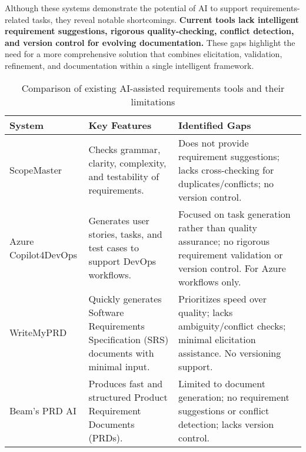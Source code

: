 Although these systems demonstrate the potential of AI to support requirements-related tasks, they reveal notable shortcomings. \textbf{Current tools lack intelligent requirement suggestions, rigorous quality-checking, conflict detection, and version control for evolving documentation.} These gaps highlight the need for a more comprehensive solution that combines elicitation, validation, refinement, and documentation within a single intelligent framework.
\begin{table}[h!]
\centering
\begin{tabular}{|p{4cm}|p{4cm}|p{4cm}|}
\hline
\textbf{System} & \textbf{Key Features} & \textbf{Identified Gaps} \\ \hline
ScopeMaster & Checks grammar, clarity, complexity, and testability of requirements. & Does not provide requirement suggestions; lacks cross-checking for duplicates/conflicts; no version control. \\ \hline
Azure Copilot4DevOps & Generates user stories, tasks, and test cases to support DevOps workflows. & Focused on task generation rather than quality assurance; no rigorous requirement validation or version control. For Azure workflows only.\\ \hline
WriteMyPRD & Quickly generates Software Requirements Specification (SRS) documents with minimal input. & Prioritizes speed over quality; lacks ambiguity/conflict checks; minimal elicitation assistance. No versioning support.\\ \hline
Beam’s PRD AI & Produces fast and structured Product Requirement Documents (PRDs). & Limited to document generation; no requirement suggestions or conflict detection; lacks version control. \\ \hline
\end{tabular}
\caption{Comparison of existing AI-assisted requirements tools and their limitations}
\label{tab:existing-solutions}
\end{table}
